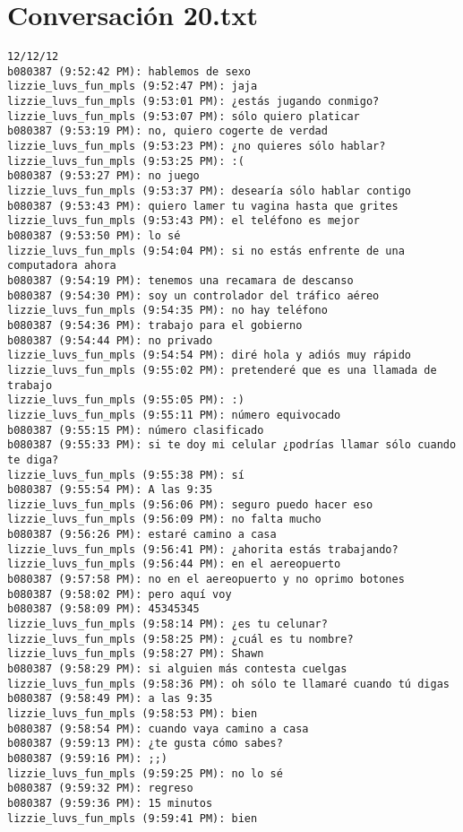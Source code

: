 \section{Conversaci\'on 20.txt}

\begin{verbatim}
12/12/12
b080387 (9:52:42 PM): hablemos de sexo
lizzie_luvs_fun_mpls (9:52:47 PM): jaja
lizzie_luvs_fun_mpls (9:53:01 PM): ¿estás jugando conmigo?
lizzie_luvs_fun_mpls (9:53:07 PM): sólo quiero platicar
b080387 (9:53:19 PM): no, quiero cogerte de verdad
lizzie_luvs_fun_mpls (9:53:23 PM): ¿no quieres sólo hablar?
lizzie_luvs_fun_mpls (9:53:25 PM): :(
b080387 (9:53:27 PM): no juego
lizzie_luvs_fun_mpls (9:53:37 PM): desearía sólo hablar contigo
b080387 (9:53:43 PM): quiero lamer tu vagina hasta que grites
lizzie_luvs_fun_mpls (9:53:43 PM): el teléfono es mejor
b080387 (9:53:50 PM): lo sé
lizzie_luvs_fun_mpls (9:54:04 PM): si no estás enfrente de una computadora ahora
b080387 (9:54:19 PM): tenemos una recamara de descanso
b080387 (9:54:30 PM): soy un controlador del tráfico aéreo 
lizzie_luvs_fun_mpls (9:54:35 PM): no hay teléfono
b080387 (9:54:36 PM): trabajo para el gobierno
b080387 (9:54:44 PM): no privado
lizzie_luvs_fun_mpls (9:54:54 PM): diré hola y adiós muy rápido
lizzie_luvs_fun_mpls (9:55:02 PM): pretenderé que es una llamada de trabajo
lizzie_luvs_fun_mpls (9:55:05 PM): :)
lizzie_luvs_fun_mpls (9:55:11 PM): número equivocado
b080387 (9:55:15 PM): número clasificado
b080387 (9:55:33 PM): si te doy mi celular ¿podrías llamar sólo cuando te diga?
lizzie_luvs_fun_mpls (9:55:38 PM): sí
b080387 (9:55:54 PM): A las 9:35
lizzie_luvs_fun_mpls (9:56:06 PM): seguro puedo hacer eso
lizzie_luvs_fun_mpls (9:56:09 PM): no falta mucho
b080387 (9:56:26 PM): estaré camino a casa
lizzie_luvs_fun_mpls (9:56:41 PM): ¿ahorita estás trabajando?
lizzie_luvs_fun_mpls (9:56:44 PM): en el aereopuerto
b080387 (9:57:58 PM): no en el aereopuerto y no oprimo botones
b080387 (9:58:02 PM): pero aquí voy
b080387 (9:58:09 PM): 45345345
lizzie_luvs_fun_mpls (9:58:14 PM): ¿es tu celunar?
lizzie_luvs_fun_mpls (9:58:25 PM): ¿cuál es tu nombre?
lizzie_luvs_fun_mpls (9:58:27 PM): Shawn
b080387 (9:58:29 PM): si alguien más contesta cuelgas
lizzie_luvs_fun_mpls (9:58:36 PM): oh sólo te llamaré cuando tú digas
b080387 (9:58:49 PM): a las 9:35
lizzie_luvs_fun_mpls (9:58:53 PM): bien
b080387 (9:58:54 PM): cuando vaya camino a casa
b080387 (9:59:13 PM): ¿te gusta cómo sabes?
b080387 (9:59:16 PM): ;;)
lizzie_luvs_fun_mpls (9:59:25 PM): no lo sé
b080387 (9:59:32 PM): regreso
b080387 (9:59:36 PM): 15 minutos
lizzie_luvs_fun_mpls (9:59:41 PM): bien

\end{verbatim}
